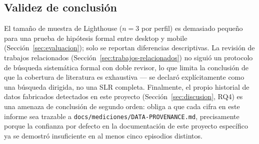 \subsection{Validez de conclusión}
El tamaño de muestra de Lighthouse ($n=3$ por perfil) es demasiado pequeño para una prueba de hipótesis
formal entre desktop y mobile (Sección~\ref{sec:evaluacion}); solo se reportan diferencias descriptivas.
La revisión de trabajos relacionados (Sección~\ref{sec:trabajos-relacionados}) no siguió un protocolo de
búsqueda sistemática formal con doble revisor, lo que limita la conclusión de que la cobertura de
literatura es exhaustiva --- se declaró explícitamente como una búsqueda dirigida, no una SLR completa.
Finalmente, el propio historial de datos fabricados detectados en este proyecto (Sección~\ref{sec:discusion},
RQ4) es una amenaza de conclusión de segundo orden: obliga a que cada cifra en este informe sea trazable
a \texttt{docs/mediciones/DATA-PROVENANCE.md}, precisamente porque la confianza por defecto en la
documentación de este proyecto específico ya se demostró insuficiente en al menos cinco episodios
distintos.
\newpage
